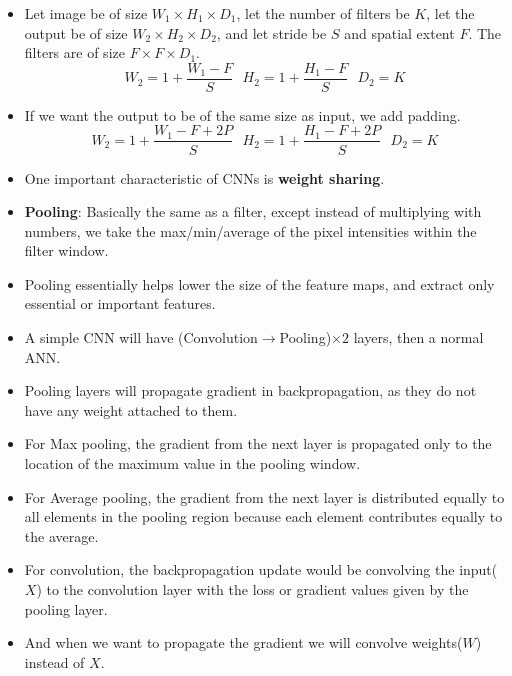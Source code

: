 \documentclass[a4paper]{article}
\begin{document}
\begin{itemize}
    \item Let image be of size $W_1\times H_1\times D_1$, let the number of filters be $K$, let the output be of size $W_2\times H_2\times D_2$, and let stride be $S$ and spatial extent $F$. The filters are of size $F\times F\times D_1$.
    \begin{equation*}
        W_2=1+\frac{W_1-F}{S}\text{     }H_2=1+\frac{H_1-F}{S}\text{     }D_2=K
    \end{equation*}
    \item If we want the output to be of the same size as input, we add padding.
    \begin{equation*}
        W_2=1+\frac{W_1-F+2P}{S}\text{     }H_2=1+\frac{H_1-F+2P}{S}\text{     }D_2=K
    \end{equation*}
    \item One important characteristic of CNNs is \textbf{weight sharing}.
    \item \textbf{Pooling}: Basically the same as a filter, except instead of multiplying with numbers, we take the max/min/average of the pixel intensities within the filter window.
    \item Pooling essentially helps lower the size of the feature maps, and extract only essential or important features.
    \item A simple CNN will have (Convolution$\to$Pooling)$\times 2$ layers, then a normal ANN.
    \item Pooling layers will propagate gradient in backpropagation, as they do not have any weight attached to them.
    \item For Max pooling, the gradient from the next layer is propagated only to the location of the maximum value in the pooling window.
    \item For Average pooling, the gradient from the next layer is distributed equally to all elements in the pooling region because each element contributes equally to the average.
    \item For convolution, the backpropagation update would be convolving the input($X$) to the convolution layer with the loss or gradient values given by the pooling layer.
    \item And when we want to propagate the gradient we will convolve weights($W$) instead of $X$.
\end{itemize}
\end{document}
